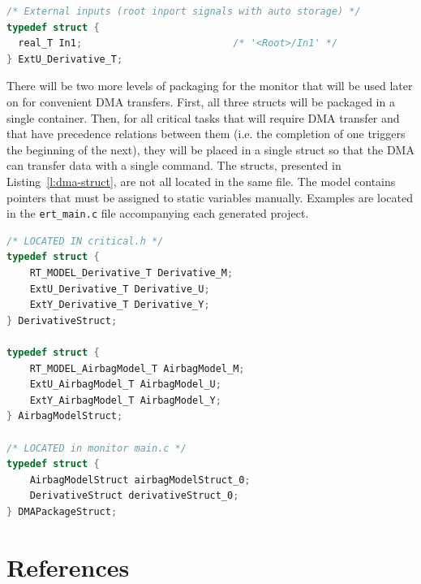 \documentclass[table,11pt]{article}
\begin{document}
\begin{lstlisting}[caption={Derivative input struct definition},label=l:der-input,language=C]
/* External inputs (root inport signals with auto storage) */
typedef struct {
  real_T In1;                          /* '<Root>/In1' */
} ExtU_Derivative_T;
\end{lstlisting}

There will be two more levels of packaging for the monitor that will be used later on for convenient DMA transfers. First, all three structs will be packaged in a single container. Then, for all critical tasks that will require DMA transfer and that have precedence relations between them (i.e. the completion of one triggers the beginning of the next), they will be placed in a single struct so that the DMA can transfer data with a single command. The structs, presented in Listing~\ref{l:dma-struct}, are not all located in the same file. The model contains pointers that must be assigned to static variables manually. Examples are located in the \texttt{ert\_main.c} file accompanying each generated project.

\begin{lstlisting}[caption={Structures of structures to facilitate DMA transfer.},label=l:dma-struct,language=C]
/* LOCATED IN critical.h */
typedef struct {
	RT_MODEL_Derivative_T Derivative_M;
	ExtU_Derivative_T Derivative_U;
	ExtY_Derivative_T Derivative_Y;
} DerivativeStruct;

typedef struct {
	RT_MODEL_AirbagModel_T AirbagModel_M;
	ExtU_AirbagModel_T AirbagModel_U;
	ExtY_AirbagModel_T AirbagModel_Y;
} AirbagModelStruct;

/* LOCATED in monitor main.c */
typedef struct {
	AirbagModelStruct airbagModelStruct_0;
	DerivativeStruct derivativeStruct_0;
} DMAPackageStruct;
\end{lstlisting}







\section{References}

\begingroup
\renewcommand{\section}[2]{}%


\endgroup
\end{document}
